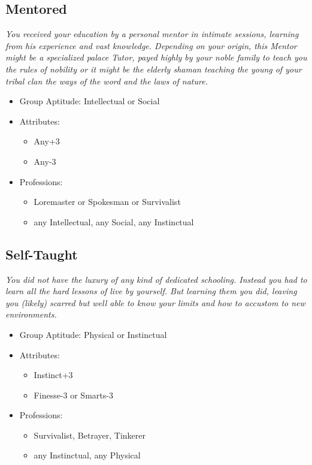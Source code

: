 	\subsection{Mentored}
	\textit{You received your education by a personal mentor in intimate sessions, learning from his experience and vast knowledge. Depending on your origin, this Mentor might be a specialized palace Tutor, payed highly by your noble family to teach you the rules of nobility or it might be the elderly shaman teaching the young of your tribal clan the ways of the word and the laws of nature.}
	\begin{itemize}
		\item Group Aptitude: Intellectual or Social
		\item Attributes:
		\begin{itemize}
			\item Any+3
			\item Any-3
		\end{itemize}
		\item Professions:
		\begin{itemize}
			\item Loremaster or Spokesman or Survivalist
			\item any Intellectual, any Social, any Instinctual
		\end{itemize}
	\end{itemize}

	\subsection{Self-Taught}
	\textit{You did not have the luxury of any kind of dedicated schooling. Instead you had to learn all the hard lessons of live by yourself. But learning them you did, leaving you (likely) scarred but well able to know your limits and how to accustom to new environments.}
	\begin{itemize}
		\item Group Aptitude: Physical or Instinctual
		\item Attributes:
		\begin{itemize}
			\item Instinct+3
			\item Finesse-3 or Smarts-3
		\end{itemize}
		\item Professions:
		\begin{itemize}
			\item Survivalist, Betrayer, Tinkerer
			\item any Instinctual, any Physical
		\end{itemize}
	\end{itemize}

